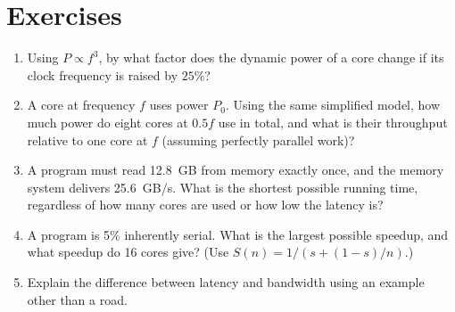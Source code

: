 \section*{Exercises}
\begin{enumerate}[label=\textbf{\thechapter.\arabic*},leftmargin=*]
  \item Using $P\propto f^3$, by what factor does the dynamic power of a core change if its clock frequency
        is raised by $25\%$?
  \item A core at frequency $f$ uses power $P_0$. Using the same simplified model, how much
        power do eight cores at $0.5f$ use in total, and what is their throughput relative to one core at $f$
        (assuming perfectly parallel work)?
  \item A program must read 12.8~GB from memory exactly once, and the memory system delivers
        25.6~GB/s. What is the shortest possible running time, regardless of how many cores are used or how
        low the latency is?
  \item A program is 5\% inherently serial. What is the largest possible speedup, and what speedup
        do 16 cores give? (Use $S(n)=1/(s+(1-s)/n)$.)
  \item Explain the difference between latency and bandwidth using an example other than a road.
\end{enumerate}